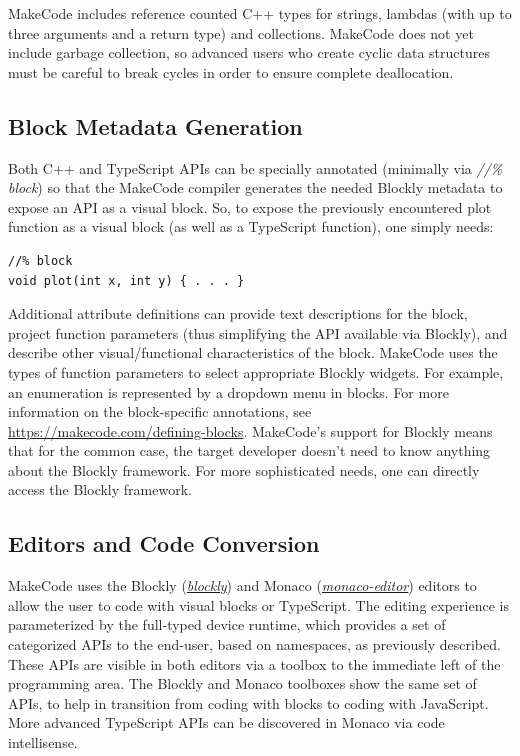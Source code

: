 MakeCode includes reference counted C++ types for strings, lambdas (with
up to three arguments and a return type) and collections.  
MakeCode does not yet include garbage collection, so advanced users who create cyclic
data structures must be careful to break cycles in order to ensure complete deallocation. 

\subsection{Block Metadata Generation}

Both C++ and TypeScript APIs can be specially annotated (minimally via 
\emph{//\% block}) so that the MakeCode compiler generates the needed
Blockly metadata to expose an API as a visual block. So, to expose the previously
encountered plot function as a visual block (as well as a TypeScript function), one simply needs:
\begin{lstlisting}
//% block
void plot(int x, int y) { . . . }
\end{lstlisting}

Additional attribute definitions can provide text descriptions for the block, project function
parameters (thus simplifying the API available via Blockly), and describe other visual/functional
characteristics of the block.  MakeCode uses the types of function parameters to select appropriate
Blockly widgets.  For example, an enumeration is represented by a dropdown menu in blocks.
For more information on the block-specific annotations, see 
\url{https://makecode.com/defining-blocks}. 
MakeCode's support for Blockly means that for the common case, the target developer doesn't need
to know anything about the Blockly framework.  For more sophisticated needs, one can directly access
the Blockly framework. 

\subsection{Editors and Code Conversion}

MakeCode uses the Blockly (\emph{\href{https://github.com/google/blockly}{blockly}}) and Monaco 
(\emph{\href{https://github.com/Microsoft/monaco-editor}{monaco-editor}}) editors to allow the user to code with
visual blocks or TypeScript. The editing experience is parameterized by the full-typed device
runtime, which provides a set of categorized APIs to the end-user, based on namespaces, as
previously described. These APIs are visible in both editors via a toolbox to the immediate
left of the programming area. The Blockly and Monaco toolboxes show the same set of APIs, to
help in transition from coding with blocks to coding with JavaScript. More advanced TypeScript
APIs can be discovered in Monaco via code intellisense.

